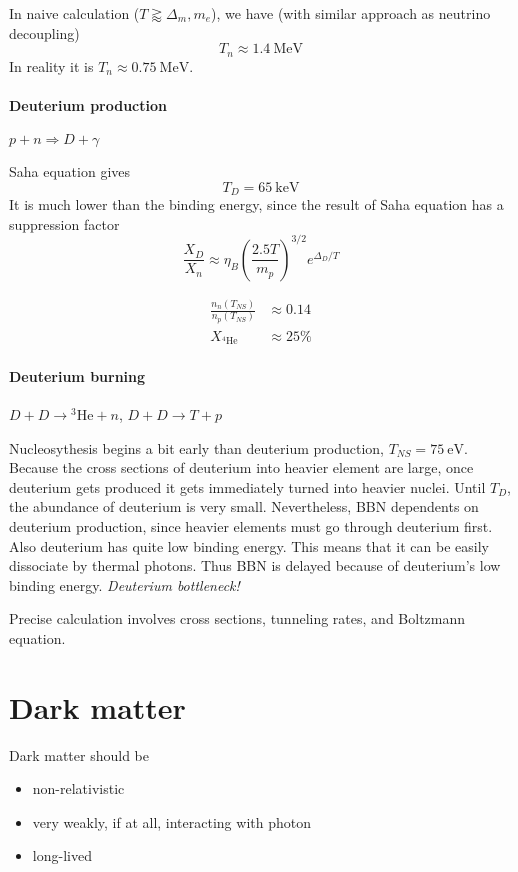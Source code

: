\documentclass[12pt, a4paper, DIV=15]{article}
\numberwithin{equation}{section}
\begin{document}
In naive calculation ($T \gtrapprox \Delta_m, m_e$), we have (with similar approach as neutrino decoupling)
\begin{equation}
   T_n \approx \SI{1.4}{\mega\eV} 
\end{equation}
In reality it is $T_n \approx \SI{0.75}{\mega\eV}$.

\paragraph{Deuterium production}
$p+n \Rightarrow D+\gamma$

Saha equation gives
\begin{equation}
   T_D = \SI{65}{\kilo\eV}
\end{equation}
It is much lower than the binding energy, since the result of Saha equation has a suppression factor
\begin{equation}
   \frac{X_D}{X_n} \approx \eta_B \left( \frac{2.5 T}{m_p} \right)^{3/2} e^{\Delta_D / T}
\end{equation}

\begin{align}
   \frac{n_n(T_{NS})}{n_p(T_{NS})} &\approx 0.14 \\
   X_{{}^4 \text{He}} &\approx 25 \%
\end{align}
\paragraph{Deuterium burning}
$D+ D \rightarrow {}^3 \text{He} + n$, $D + D \rightarrow T+ p$

Nucleosythesis begins a bit early than deuterium production, $T_{NS} = \SI{75}{\eV}$. Because the cross sections of deuterium into heavier element are large, once deuterium gets produced it gets immediately turned into heavier nuclei. Until $T_D$, the abundance of deuterium is very small. Nevertheless, BBN dependents on deuterium production, since heavier elements must go through deuterium first. Also deuterium has quite low binding energy. This means that it can be easily dissociate by thermal photons. Thus BBN is delayed because of deuterium's low binding energy. \textit{Deuterium bottleneck!}

Precise calculation involves cross sections, tunneling rates, and Boltzmann equation.

\section{Dark matter}
Dark matter should be
\begin{itemize}
   \item non-relativistic
   \item very weakly, if at all, interacting with photon
   \item long-lived
\end{itemize}
\end{document}
